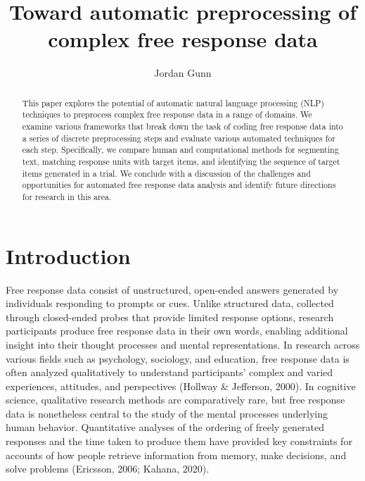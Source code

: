 \documentclass[
  letterpaper,
  DIV=11,
  numbers=noendperiod]{scrreprt}
\title{Toward automatic preprocessing of complex free response data}
\author{Jordan Gunn}
\date{}
\renewcommand*\contentsname{Table of contents}
\newcommand\contentsname{Table of contents}
\begin{document}
\maketitle
\begin{abstract}
This paper explores the potential of automatic natural language
processing (NLP) techniques to preprocess complex free response data in
a range of domains. We examine various frameworks that break down the
task of coding free response data into a series of discrete
preprocessing steps and evaluate various automated techniques for each
step. Specifically, we compare human and computational methods for
segmenting text, matching response units with target items, and
identifying the sequence of target items generated in a trial. We
conclude with a discussion of the challenges and opportunities for
automated free response data analysis and identify future directions for
research in this area.
\end{abstract}
\ifdefined\Shaded\renewenvironment{Shaded}{\begin{tcolorbox}[boxrule=0pt, borderline west={3pt}{0pt}{shadecolor}, frame hidden, breakable, sharp corners, interior hidden, enhanced]}{\end{tcolorbox}}\fi

\renewcommand*\contentsname{Table of contents}
{
\hypersetup{linkcolor=}
\setcounter{tocdepth}{2}
\tableofcontents
}

\hypertarget{introduction}{%
\chapter{Introduction}\label{introduction}}

Free response data consist of unstructured, open-ended answers generated
by individuals responding to prompts or cues. Unlike structured data,
collected through closed-ended probes that provide limited response
options, research participants produce free response data in their own
words, enabling additional insight into their thought processes and
mental representations. In research across various fields such as
psychology, sociology, and education, free response data is often
analyzed qualitatively to understand participants' complex and varied
experiences, attitudes, and perspectives (Hollway \& Jefferson, 2000).
In cognitive science, qualitative research methods are comparatively
rare, but free response data is nonetheless central to the study of the
mental processes underlying human behavior. Quantitative analyses of the
ordering of freely generated responses and the time taken to produce
them have provided key constraints for accounts of how people retrieve
information from memory, make decisions, and solve problems (Ericsson,
2006; Kahana, 2020).
\end{document}
